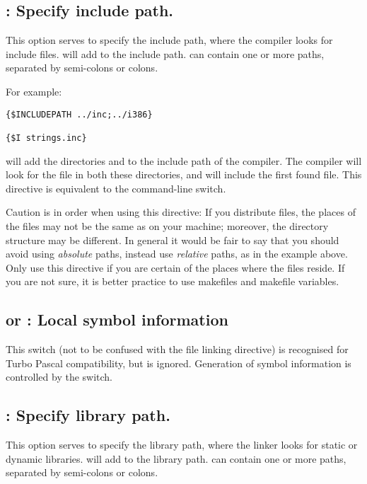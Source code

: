 \subsection{ : Specify include path.}

This option serves to specify the include path, where the compiler looks for
include files.  will add  to the include
path.  can contain one or more paths, separated by semi-colons or
colons.

For example:
\begin{verbatim}
{$INCLUDEPATH ../inc;../i386}

{$I strings.inc}
\end{verbatim}

will add the directories  and  to the include
path of the compiler. The compiler will look for the file 
in both these directories, and will include the first found file. This directive is
equivalent to the  command-line switch.

Caution is in order when using this directive: If you distribute files, the
places of the files may not be the same as on your machine; moreover, the
directory structure may be different. In general it would be fair to say
that you should avoid using {\em absolute} paths, instead use {\em relative}
paths, as in the example above. Only use this directive if you are certain
of the places where the files reside. If you are not sure, it is better
practice to use makefiles and makefile variables.

\subsection{ or  : Local symbol information}

This switch (not to be confused with the  file linking
directive) is recognised for Turbo Pascal compatibility, but is ignored.
Generation of symbol information is controlled by the  switch.

\subsection{ : Specify library path.}

This option serves to specify the library path, where the linker looks for
static or dynamic libraries.  will add 
to the library path.  can contain one or more paths, separated
by semi-colons or colons.

